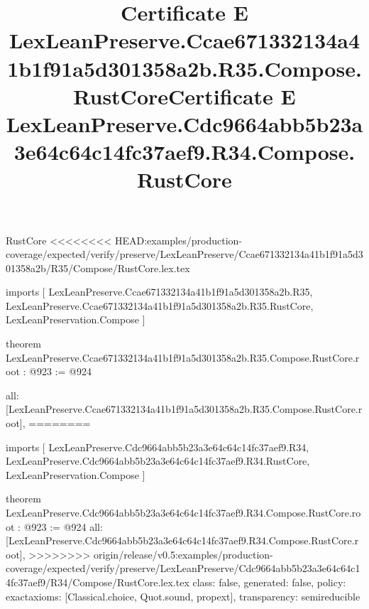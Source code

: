 \begin{lexlean}{RustCore}
<<<<<<<< HEAD:examples/production-coverage/expected/verify/preserve/LexLeanPreserve/Ccae671332134a41b1f91a5d301358a2b/R35/Compose/RustCore.lex.tex
\title{Certificate E LexLeanPreserve.Ccae671332134a41b1f91a5d301358a2b.R35.Compose.RustCore}
\begin{coremodule}
imports [
  LexLeanPreserve.Ccae671332134a41b1f91a5d301358a2b.R35,
  LexLeanPreserve.Ccae671332134a41b1f91a5d301358a2b.R35.RustCore,
  LexLeanPreservation.Compose
]

theorem LexLeanPreserve.Ccae671332134a41b1f91a5d301358a2b.R35.Compose.RustCore.root : @923 := @924 {
  all: [LexLeanPreserve.Ccae671332134a41b1f91a5d301358a2b.R35.Compose.RustCore.root],
========
\title{Certificate E LexLeanPreserve.Cdc9664abb5b23a3e64c64c14fc37aef9.R34.Compose.RustCore}
\begin{coremodule}
imports [
  LexLeanPreserve.Cdc9664abb5b23a3e64c64c14fc37aef9.R34,
  LexLeanPreserve.Cdc9664abb5b23a3e64c64c14fc37aef9.R34.RustCore,
  LexLeanPreservation.Compose
]

theorem LexLeanPreserve.Cdc9664abb5b23a3e64c64c14fc37aef9.R34.Compose.RustCore.root : @923 := @924 {
  all: [LexLeanPreserve.Cdc9664abb5b23a3e64c64c14fc37aef9.R34.Compose.RustCore.root],
>>>>>>>> origin/release/v0.5:examples/production-coverage/expected/verify/preserve/LexLeanPreserve/Cdc9664abb5b23a3e64c64c14fc37aef9/R34/Compose/RustCore.lex.tex
  class: false,
  generated: false,
  policy: exact{axioms: [Classical.choice, Quot.sound, propext]},
  transparency: semireducible
}


\end{coremodule}}
\end{coremodule}
\end{lexlean}
